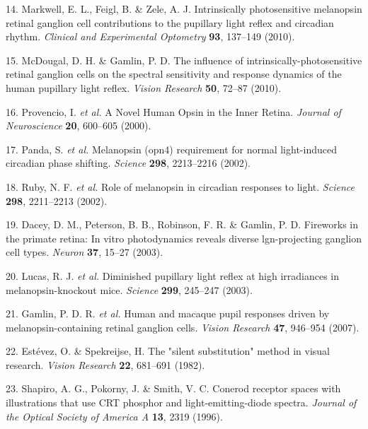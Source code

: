 \documentclass[
]{article}
\begin{document}
\leavevmode\hypertarget{ref-Markwell2010}{}%
14. Markwell, E. L., Feigl, B. \& Zele, A. J. Intrinsically photosensitive melanopsin retinal ganglion cell contributions to the pupillary light reflex and circadian rhythm. \emph{Clinical and Experimental Optometry} \textbf{93}, 137--149 (2010).

\leavevmode\hypertarget{ref-McDougal2010}{}%
15. McDougal, D. H. \& Gamlin, P. D. The influence of intrinsically-photosensitive retinal ganglion cells on the spectral sensitivity and response dynamics of the human pupillary light reflex. \emph{Vision Research} \textbf{50}, 72--87 (2010).

\leavevmode\hypertarget{ref-Provencio2000}{}%
16. Provencio, I. \emph{et al.} A Novel Human Opsin in the Inner Retina. \emph{Journal of Neuroscience} \textbf{20}, 600--605 (2000).

\leavevmode\hypertarget{ref-Panda2002}{}%
17. Panda, S. \emph{et al.} Melanopsin (opn4) requirement for normal light-induced circadian phase shifting. \emph{Science} \textbf{298}, 2213--2216 (2002).

\leavevmode\hypertarget{ref-Ruby2002}{}%
18. Ruby, N. F. \emph{et al.} Role of melanopsin in circadian responses to light. \emph{Science} \textbf{298}, 2211--2213 (2002).

\leavevmode\hypertarget{ref-Dacey2003}{}%
19. Dacey, D. M., Peterson, B. B., Robinson, F. R. \& Gamlin, P. D. Fireworks in the primate retina: In vitro photodynamics reveals diverse lgn-projecting ganglion cell types. \emph{Neuron} \textbf{37}, 15--27 (2003).

\leavevmode\hypertarget{ref-Lucas2003}{}%
20. Lucas, R. J. \emph{et al.} Diminished pupillary light reflex at high irradiances in melanopsin-knockout mice. \emph{Science} \textbf{299}, 245--247 (2003).

\leavevmode\hypertarget{ref-Gamlin2007}{}%
21. Gamlin, P. D. R. \emph{et al.} Human and macaque pupil responses driven by melanopsin-containing retinal ganglion cells. \emph{Vision Research} \textbf{47}, 946--954 (2007).

\leavevmode\hypertarget{ref-Estevez1982}{}%
22. Estévez, O. \& Spekreijse, H. The "silent substitution" method in visual research. \emph{Vision Research} \textbf{22}, 681--691 (1982).

\leavevmode\hypertarget{ref-Shapiro1996}{}%
23. Shapiro, A. G., Pokorny, J. \& Smith, V. C. Conerod receptor spaces with illustrations that use CRT phosphor and light-emitting-diode spectra. \emph{Journal of the Optical Society of America A} \textbf{13}, 2319 (1996).
\end{document}
